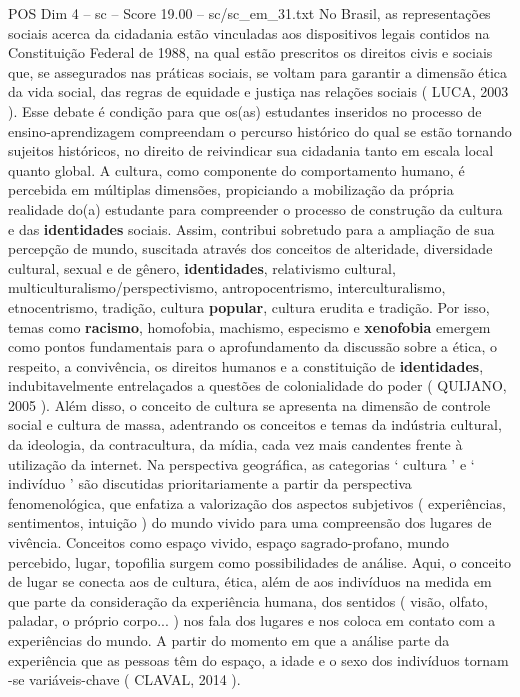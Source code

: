 \begin{textsample}{POS Dim 4 – sc – Score 19.00 – sc/sc\_em\_31.txt}
No Brasil, as representações sociais acerca da cidadania estão vinculadas aos dispositivos legais contidos na Constituição Federal de 1988, na qual estão prescritos os direitos civis e sociais que, se assegurados nas práticas sociais, se voltam para garantir a dimensão ética da vida social, das regras de equidade e justiça nas relações sociais ( LUCA, 2003 ).
Esse debate é condição para que os(as) estudantes inseridos no processo de ensino-aprendizagem compreendam o percurso histórico do qual se estão tornando sujeitos históricos, no direito de reivindicar sua cidadania tanto em escala local quanto global.
A cultura, como componente do comportamento humano, é percebida em múltiplas dimensões, propiciando a mobilização da própria realidade do(a) estudante para compreender o processo de construção da cultura e das \textbf{identidades} sociais.
Assim, contribui sobretudo para a ampliação de sua percepção de mundo, suscitada através dos conceitos de alteridade, diversidade cultural, sexual e de gênero, \textbf{identidades}, relativismo cultural, multiculturalismo/perspectivismo, antropocentrismo, interculturalismo, etnocentrismo, tradição, cultura \textbf{popular}, cultura erudita e tradição.
Por isso, temas como \textbf{racismo}, homofobia, machismo, especismo e \textbf{xenofobia} emergem como pontos fundamentais para o aprofundamento da discussão sobre a ética, o respeito, a convivência, os direitos humanos e a constituição de \textbf{identidades}, indubitavelmente entrelaçados a questões de colonialidade do poder ( QUIJANO, 2005 ).
Além disso, o conceito de cultura se apresenta na dimensão de controle social e cultura de massa, adentrando os conceitos e temas da indústria cultural, da ideologia, da contracultura, da mídia, cada vez mais candentes frente à utilização da internet.
Na perspectiva geográfica, as categorias ‘ cultura ’ e ‘ indivíduo ’ são discutidas prioritariamente a partir da perspectiva fenomenológica, que enfatiza a valorização dos aspectos subjetivos ( experiências, sentimentos, intuição ) do mundo vivido para uma compreensão dos lugares de vivência.
Conceitos como espaço vivido, espaço sagrado-profano, mundo percebido, lugar, topofilia surgem como possibilidades de análise.
Aqui, o conceito de lugar se conecta aos de cultura, ética, além de aos indivíduos na medida em que parte da consideração da experiência humana, dos sentidos ( visão, olfato, paladar, o próprio corpo... ) nos fala dos lugares e nos coloca em contato com a experiências do mundo.
A partir do momento em que a análise parte da experiência que as pessoas têm do espaço, a idade e o sexo dos indivíduos tornam -se variáveis-chave ( CLAVAL, 2014 ).

\end{textsample}
